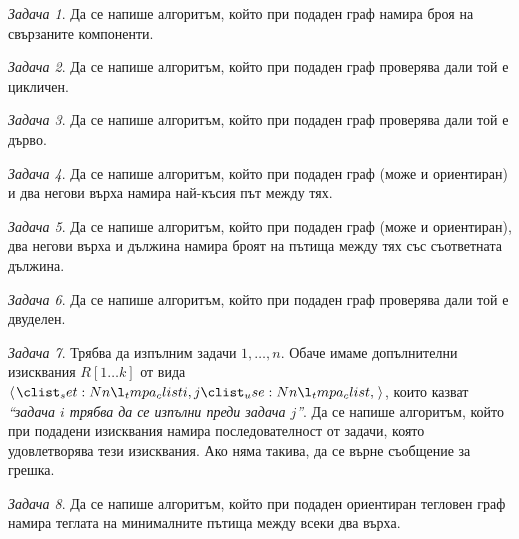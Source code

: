 \documentclass{article}
\theoremstyle{definition}
\theoremstyle{plain}
\theoremstyle{remark}
\newtheorem{problem}{Задача}
\theoremstyle{definition}
\begin{document}
\begin{problem}
Да се напише алгоритъм, който при подаден граф намира броя на свързаните компоненти.
\end{problem}

\begin{problem}
Да се напише алгоритъм, който при подаден граф проверява дали той е цикличен.
\end{problem}

\begin{problem}
Да се напише алгоритъм, който при подаден граф проверява дали той е дърво.
\end{problem}

\begin{problem}
Да се напише алгоритъм, който при подаден граф (може и ориентиран) и два негови върха намира най-късия път между тях.
\end{problem}

\begin{problem}
Да се напише алгоритъм, който при подаден граф (може и ориентиран), два негови върха и дължина намира броят на пътища между тях със съответната дължина.
\end{problem}

\begin{problem}
Да се напише алгоритъм, който при подаден граф проверява дали той е двуделен.
\end{problem}

\begin{problem}
Трябва да изпълним задачи $1, \dots, n$.
Обаче имаме допълнителни изисквания $R[1 \dots k]$ от вида $\opair{i, j}$, които казват \textit{``задача $i$ трябва да се изпълни преди задача $j$''}.
Да се напише алгоритъм, който при подадени изисквания намира последователност от задачи, която удовлетворява тези изисквания.
Ако няма такива, да се върне съобщение за грешка.
\end{problem}

\begin{problem}
Да се напише алгоритъм, който при подаден ориентиран тегловен граф намира теглата на минималните пътища между всеки два върха.
\end{problem}
\end{document}
